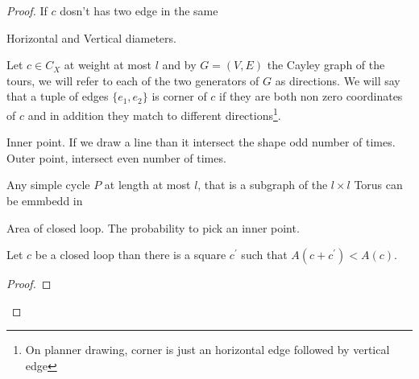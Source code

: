 \begin{proof}
  If $c$ dosn't has two edge in the same 

  \begin{definition}
    Horizontal and Vertical diameters. 
  \end{definition}


  Let $c \in C_{X}$ at weight at most $l$ and by $G = (V,E)$ the Cayley graph of the tours, we will refer to each of the two generators of $G$ as directions. We will say that a tuple of edges $\{e_{1},e_{2}\}$ is corner of $c$ if they are both non zero coordinates of $c$ and in addition they match to different directions\footnote{On planner drawing, corner is just an horizontal edge followed by vertical edge}.        
 
  \begin{definition}
    Inner point.   If we draw a line than it intersect the shape odd number of times. Outer point, intersect even number of times.
  \end{definition}

  \begin{claim}
    Any simple cycle $P$ at length at most $l$, that is a subgraph of the $l \times l$ Torus can be emmbedd in  
  \end{claim}

  \begin{definition}
    Area of closed loop. The probability to pick an inner point. 
  \end{definition}

  \begin{claim}
    Let $c$ be a closed loop than there is a square $c^{\prime}$ such that $A(c + c^{\prime}) < A(c)$.
  \end{claim}

  \begin{proof}
  \end{proof}

\end{proof}

%
%    

